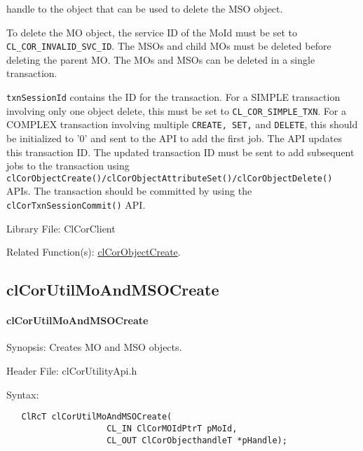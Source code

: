 \begin{flushleft}
\begin{Desc}
handle to the object that can be used to delete the MSO object. 
\par
To delete the MO object, the service ID of the MoId must be set to {\tt{CL\_\-COR\_\-INVALID\_\-SVC\_\-ID}}. The MSOs and child MOs must be deleted before 
deleting the parent MO. The MOs and MSOs can be deleted in a single transaction.
\par
{\tt{txnSessionId}} contains the ID for the transaction. For a SIMPLE transaction involving only one object delete, this must be set to 
{\tt{CL\_\-COR\_\-SIMPLE\_\-TXN}}. For a COMPLEX transaction involving multiple {\tt{CREATE, SET,}} and {\tt{DELETE}}, this should be initialized to '0' and sent to the API to 
add the first job. The API updates this transaction ID. The updated transaction ID must be sent to add subsequent jobs to 
the transaction using {\tt{clCorObjectCreate()/clCorObjectAttributeSet()/clCorObjectDelete()}} APIs. The transaction should be committed by using the
{\tt{clCorTxnSessionCommit()}} API.
\end{Desc}
\begin{Desc}
\item[Library File:]Cl\-Cor\-Client\end{Desc}
\begin{Desc}
\item[Related Function(s):]\hyperlink{pagecor100}{cl\-Cor\-Object\-Create}. \end{Desc}
\newpage



\subsection{clCorUtilMoAndMSOCreate}
\hypertarget{pagecor103}{}\paragraph{cl\-Cor\-Util\-Mo\-And\-MSO\-Create}\label{pagecor103}
\begin{Desc}
\item[Synopsis:]Creates MO and MSO objects. \end{Desc}
\begin{Desc}
\item[Header File:]clCorUtilityApi.h \end{Desc}
\begin{Desc}
\item[Syntax:]

\footnotesize\begin{verbatim}   ClRcT clCorUtilMoAndMSOCreate( 
					CL_IN ClCorMOIdPtrT pMoId, 
					CL_OUT ClCorObjecthandleT *pHandle); 


\end{verbatim}
\end{Desc}
\end{flushleft}
